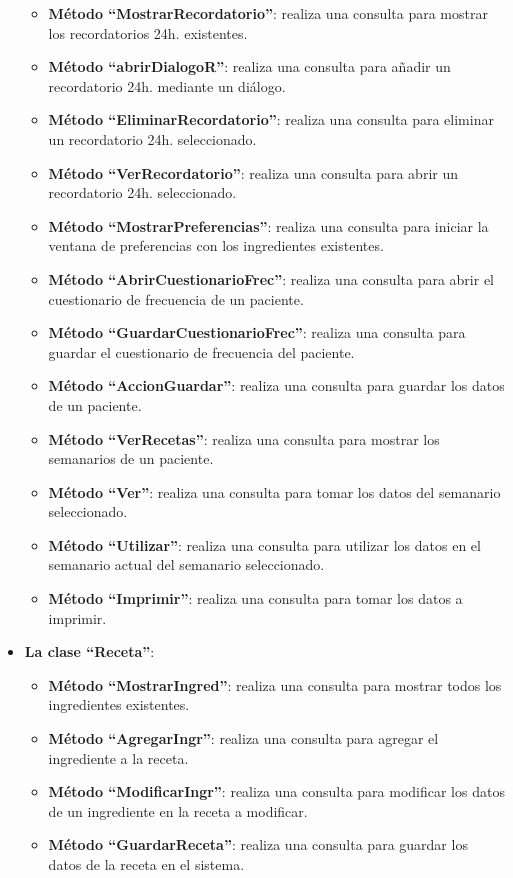 \begin{itemize}
\begin{itemize}
\item \textbf{Método ``MostrarRecordatorio''}: realiza una consulta para mostrar los recordatorios 24h. existentes.
\item \textbf{Método ``abrirDialogoR''}: realiza una consulta para añadir un recordatorio 24h. mediante un diálogo.
\item \textbf{Método ``EliminarRecordatorio''}: realiza una consulta para eliminar un recordatorio 24h. seleccionado.
\item \textbf{Método ``VerRecordatorio''}: realiza una consulta para abrir un recordatorio 24h. seleccionado.
\item \textbf{Método ``MostrarPreferencias''}: realiza una consulta para iniciar la ventana de preferencias con los ingredientes existentes.
\item \textbf{Método ``AbrirCuestionarioFrec''}: realiza una consulta para abrir el cuestionario de frecuencia de un paciente.
\item \textbf{Método ``GuardarCuestionarioFrec''}: realiza una consulta para guardar el cuestionario de frecuencia del paciente.
\item \textbf{Método ``AccionGuardar''}: realiza una consulta para guardar los datos de un paciente.
\item \textbf{Método ``VerRecetas''}: realiza una consulta para mostrar los semanarios de un paciente.
\item \textbf{Método ``Ver''}: realiza una consulta para tomar los datos del semanario seleccionado.
\item \textbf{Método ``Utilizar''}: realiza una consulta para utilizar los datos en el semanario actual del semanario seleccionado. 
\item \textbf{Método ``Imprimir''}: realiza una consulta para tomar los datos a imprimir.
\end{itemize}
\item \textbf{La clase ``Receta''}:
\begin{itemize}
\item \textbf{Método ``MostrarIngred''}: realiza una consulta para mostrar todos los ingredientes existentes.
\item \textbf{Método ``AgregarIngr''}: realiza una consulta para agregar el ingrediente a la receta.
\item \textbf{Método ``ModificarIngr''}: realiza una consulta para modificar los datos de un ingrediente en la receta a modificar. 
\item \textbf{Método ``GuardarReceta''}: realiza una consulta para guardar los datos de la receta en el sistema.

\end{itemize}
\end{itemize}

